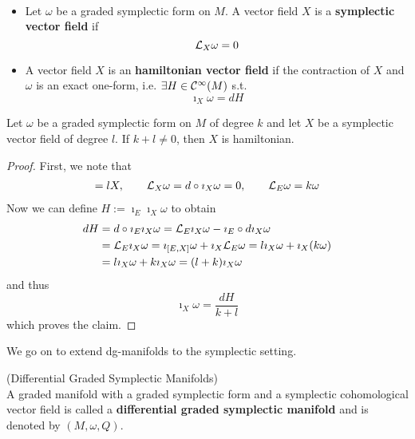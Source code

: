 \begin{definition}~
\begin{itemize}
  \item Let $\omega$ be a graded symplectic form on $M$. A vector field $X$ is a \textbf{symplectic vector field} if
  $$ \mathcal{L}_{X}\omega = 0 $$

  \item A vector field $X$ is an \textbf{hamiltonian vector field} if the contraction of $X$ and $\omega$ is an exact one-form, i.e. $\exists H \in \mathcal{C}^{\infty}(M)$ s.t.
  $$ \imath_X \omega = dH $$

\end{itemize}
\end{definition}

\begin{lem}
  Let $\omega$ be a graded symplectic form on $M$ of degree $k$ and let $X$ be a symplectic vector field of degree $l$. If $k+l \neq 0$, then $X$ is hamiltonian.

\begin{proof}
  First, we note that
  \begin{align*}
    [E,X] = lX, \quad \quad \lie{X}\omega = d \circ \imath_X \omega = 0, \quad \quad \lie{E}\omega = k\omega
  \end{align*}
  Now we can define $H:=\imath_E\imath_X \omega$ to obtain
  \begin{align*}
    dH &= d \circ \imath_E\imath_X \omega = \mathcal{L}_{E}\imath_X\omega - \imath_E \circ d\imath_X\omega\\
    &= \mathcal{L}_{E}\imath_X \omega = \imath_{[E,X]} \omega + \imath_X \mathcal{L}_{E}\omega = l \imath_X\omega + \imath_X(k\omega)\\
    &= l \imath_X\omega + k \imath_X \omega = (l+k) \imath_X \omega
  \end{align*}
  and thus
  $$ \imath_X\omega = \frac{dH}{k+l} $$
  which proves the claim.
\end{proof}
\end{lem}

We go on to extend dg-manifolds to the symplectic setting.

\begin{definition} (Differential Graded Symplectic Manifolds)\\
  A graded manifold with a graded symplectic form and a symplectic cohomological vector field is called a \textbf{differential graded symplectic manifold} and is denoted by $(M, \omega, Q)$.
\end{definition}

